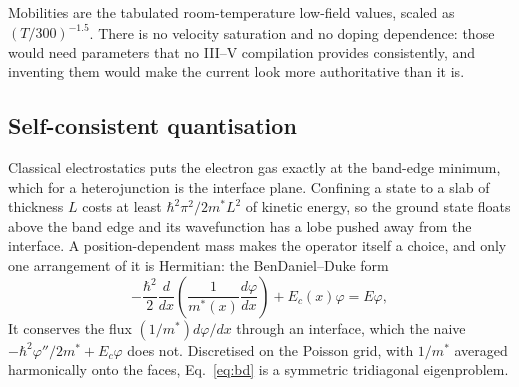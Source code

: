 \documentclass[preprint,12pt]{elsarticle}
\begin{document}
Mobilities are the tabulated room-temperature low-field values, scaled as
$(T/300)^{-1.5}$. There is no velocity saturation and no doping dependence:
those would need parameters that no III--V compilation provides consistently,
and inventing them would make the current look more authoritative than it is.

\subsection{Self-consistent quantisation}
\label{sec:quantum}

Classical electrostatics puts the electron gas exactly at the band-edge
minimum, which for a heterojunction is the interface plane. Confining a state
to a slab of thickness $L$ costs at least $\hbar^2\pi^2/2m^{*}L^2$ of kinetic
energy, so the ground state floats above the band edge and its wavefunction
has a lobe pushed away from the interface. A position-dependent mass makes the operator itself a choice, and only one
arrangement of it is Hermitian: the BenDaniel--Duke form~\cite{BenDaniel1966}
\begin{equation}
  -\frac{\hbar^2}{2}\frac{d}{dx}\!\left(\frac{1}{m^{*}(x)}
  \frac{d\varphi}{dx}\right) + E_c(x)\varphi = E\varphi,
  \label{eq:bd}
\end{equation}
It conserves the flux $(1/m^{*})d\varphi/dx$ through an interface, which the
naive $-\hbar^2\varphi''/2m^{*}+E_c\varphi$ does not. Discretised on the Poisson
grid, with $1/m^{*}$ averaged harmonically onto the faces,
Eq.~\eqref{eq:bd} is a symmetric tridiagonal eigenproblem.
\end{document}
